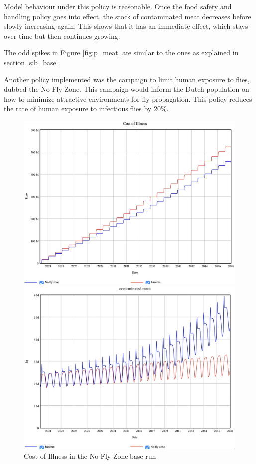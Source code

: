 Model behaviour under this policy is reasonable. Once the food safety and handling policy goes into effect, the stock of contaminated meat decreases before slowly increasing again. This shows that it has an immediate effect, which stays over time but then continues growing. 

The odd spikes in Figure \ref{fig:p_meat} are similar to the ones as explained in section \ref{s:b_base}. 

Another policy implemented was the campaign to limit human exposure to flies, dubbed the No Fly Zone. This campaign would inform the Dutch population on how to minimize attractive environments for fly propagation. This policy reduces the rate of human exposure to infectious flies by 20\%. 

\begin{figure}[h!]
    \centering
    \begin{minipage}{0.45\textwidth}
        \centering
        \includegraphics[width=1\textwidth]{images/p2_coi.jpeg} 
        \caption{Cost of Illness in the No Fly Zone base run}
        \label{fig:p2_coi}
    \end{minipage}\hfill
    \begin{minipage}{0.45\textwidth}
        \centering
        \includegraphics[width=1\textwidth]{images/p2_meat.jpeg}

\end{minipage}
\end{figure}

